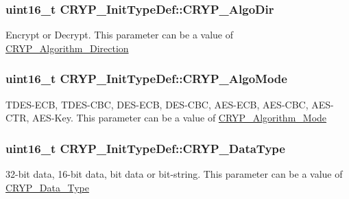 \subsubsection[{C\+R\+Y\+P\+\_\+\+Algo\+Dir}]{\setlength{\rightskip}{0pt plus 5cm}uint16\+\_\+t C\+R\+Y\+P\+\_\+\+Init\+Type\+Def\+::\+C\+R\+Y\+P\+\_\+\+Algo\+Dir}\label{struct_c_r_y_p___init_type_def_a3531fac011936e54f131224eb056c887}
Encrypt or Decrypt. This parameter can be a value of \hyperlink{group___c_r_y_p___algorithm___direction}{C\+R\+Y\+P\+\_\+\+Algorithm\+\_\+\+Direction} \hypertarget{struct_c_r_y_p___init_type_def_a984279e9849467c7dc940ffad01924f5}{}
\subsubsection[{C\+R\+Y\+P\+\_\+\+Algo\+Mode}]{\setlength{\rightskip}{0pt plus 5cm}uint16\+\_\+t C\+R\+Y\+P\+\_\+\+Init\+Type\+Def\+::\+C\+R\+Y\+P\+\_\+\+Algo\+Mode}\label{struct_c_r_y_p___init_type_def_a984279e9849467c7dc940ffad01924f5}
T\+D\+E\+S-\/\+E\+C\+B, T\+D\+E\+S-\/\+C\+B\+C, D\+E\+S-\/\+E\+C\+B, D\+E\+S-\/\+C\+B\+C, A\+E\+S-\/\+E\+C\+B, A\+E\+S-\/\+C\+B\+C, A\+E\+S-\/\+C\+T\+R, A\+E\+S-\/\+Key. This parameter can be a value of \hyperlink{group___c_r_y_p___algorithm___mode}{C\+R\+Y\+P\+\_\+\+Algorithm\+\_\+\+Mode} \hypertarget{struct_c_r_y_p___init_type_def_aeaa94577ae8ff5a34a9fcf4d6424933f}{}
\subsubsection[{C\+R\+Y\+P\+\_\+\+Data\+Type}]{\setlength{\rightskip}{0pt plus 5cm}uint16\+\_\+t C\+R\+Y\+P\+\_\+\+Init\+Type\+Def\+::\+C\+R\+Y\+P\+\_\+\+Data\+Type}\label{struct_c_r_y_p___init_type_def_aeaa94577ae8ff5a34a9fcf4d6424933f}
32-\/bit data, 16-\/bit data, bit data or bit-\/string. This parameter can be a value of \hyperlink{group___c_r_y_p___data___type}{C\+R\+Y\+P\+\_\+\+Data\+\_\+\+Type} \hypertarget{struct_c_r_y_p___init_type_def_ace9e0f21c16a2280a6d7325517c2a9b5}{}
